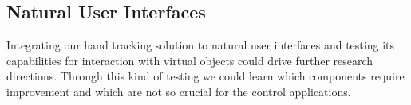 \subsection*{Natural User Interfaces}
Integrating our hand tracking solution to natural user interfaces and testing its capabilities for interaction with virtual objects could drive further research directions. Through this kind of testing we could learn which components require improvement and which are not so crucial for the control applications.

